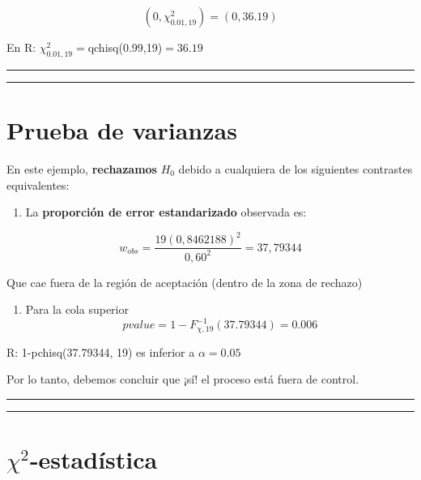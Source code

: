 \documentclass[
]{book}
\providecommand{\tightlist}{%
  \setlength{\itemsep}{0pt}\setlength{\parskip}{0pt}}
\begin{document}
\[(0, \chi^2_{0.01,19})=(0,36.19)\]

En R: \(\chi^2_{0.01,19}=\)qchisq(0.99,19)\(= 36.19\)

\begin{center}\rule{0.5\linewidth}{0.5pt}\end{center}

\begin{center}\rule{0.5\linewidth}{0.5pt}\end{center}

\hypertarget{prueba-de-varianzas-5}{%
\section{Prueba de varianzas}\label{prueba-de-varianzas-5}}

En este ejemplo, \textbf{rechazamos} \(H_0\) debido a cualquiera de los siguientes contrastes equivalentes:

\begin{enumerate}
\def\labelenumi{\arabic{enumi}.}
\tightlist
\item
  La \textbf{proporción de error estandarizado} observada es:
\end{enumerate}

\[w_{obs}=\frac{19 (0,8462188)^2}{0,60^2}=37,79344\]

Que cae fuera de la región de aceptación (dentro de la zona de rechazo)

\begin{enumerate}
\def\labelenumi{\arabic{enumi}.}
\setcounter{enumi}{1}
\tightlist
\item
  Para la cola superior \[pvalue=1-F_{\chi,19}^{-1}(37.79344)= 0.006\]
\end{enumerate}

R: 1-pchisq(37.79344, 19)
es inferior a \(\alpha=0.05\)

Por lo tanto, debemos concluir que ¡sí! el proceso está fuera de control.

\begin{center}\rule{0.5\linewidth}{0.5pt}\end{center}

\begin{center}\rule{0.5\linewidth}{0.5pt}\end{center}

\hypertarget{chi2-estaduxedstica-2}{%
\section{\texorpdfstring{\(\chi^2\)-estadística}{\textbackslash chi\^{}2-estadística}}\label{chi2-estaduxedstica-2}}
\end{document}

